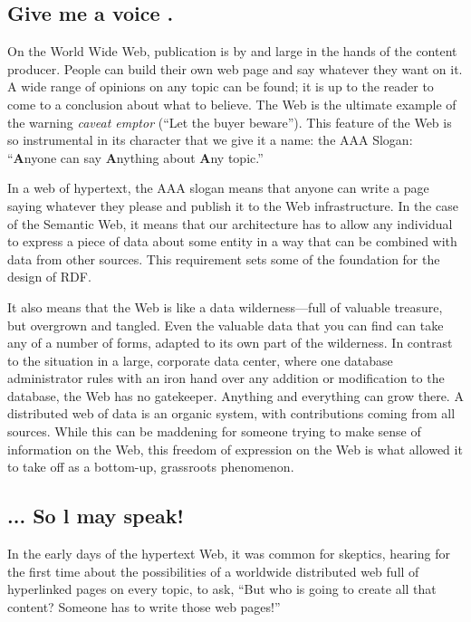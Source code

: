 \subsection{Give me a voice .}

On the World Wide Web, publication is by and large in the hands of the
content producer. People can build their own web page and say whatever
they want on it. A wide range of opinions on any topic can be found; it
is up to the reader to come to a conclusion about what to believe. The
Web is the ultimate example of the warning \emph{caveat emptor} (``Let
the buyer beware''). This feature of the Web is so instrumental in its
character that we give it a name: the AAA Slogan: ``\textbf{A}nyone can
say \textbf{A}nything about \textbf{A}ny topic.''

In a web of hypertext, the AAA slogan means that anyone can write a page
saying whatever they please and publish it to the Web infrastructure. In
the case of the Semantic Web, it means that our
architecture has to allow any individual to express a piece of data
about some entity in a way that can be combined with data from other
sources. This requirement sets some of the foundation for the design of
RDF.

It also means that the Web is like a data wilderness---full of valuable
treasure, but overgrown and tangled. Even the valuable data that you can
find can take any of a number of forms, adapted to its own part of the
wilderness. In contrast to the situation in a large, corporate data
center, where one database administrator rules with an iron hand over
any addition or modification to the database, the Web has no gatekeeper.
Anything and everything can grow there. A distributed web of data is an
organic system, with contributions coming from all sources. While this
can be maddening for someone trying to make sense of information on the
Web, this freedom of expression on the Web is what allowed it to take
off as a bottom-up, grassroots phenomenon.

\subsection{... So l may speak!}

In the early days of the hypertext Web, it was common for skeptics,
hearing for the first time about the possibilities of a worldwide
distributed web full of hyperlinked pages on every topic, to ask, ``But
who is going to create all that content? Someone has to write those web
pages!''

